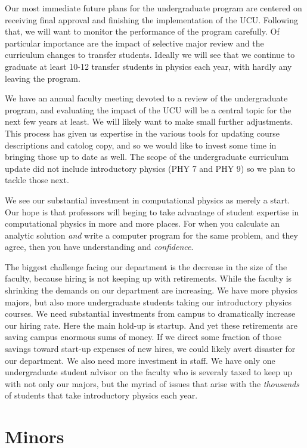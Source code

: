 \documentclass[12pt]{article}
\begin{document}
Our most immediate future plans for the undergraduate program are
centered on receiving final approval and finishing the implementation
of the UCU.  Following that, we will want to monitor the performance
of the program carefully.  Of particular importance are the impact of
selective major review and the curriculum changes to transfer
students.  Ideally we will see that we continue to graduate at least
10-12 transfer students in physics each year, with hardly any leaving
the program.

We have an annual faculty meeting devoted to a review of the
undergraduate program, and evaluating the impact of the UCU will be a
central topic for the next few years at least.  We will likely want to
make small further adjustments.  This process has given us expertise
in the various tools for updating course descriptions and catolog
copy, and so we would like to invest some time in bringing those up to
date as well.  The scope of the undergraduate curriculum update did
not include introductory physics (PHY 7 and PHY 9) so we plan to
tackle those next.

We see our substantial investment in computational physics as merely a
start.  Our hope is that professors will beging to take advantage of
student expertise in computational physics in more and more places.
For when you calculate an analytic solution {\em and} write a computer
program for the same problem, and they agree, then you have
understanding and {\em confidence}.

The biggest challenge facing our department is the decrease in the
size of the faculty, because hiring is not keeping up with
retirements.  While the faculty is shrinking the demands on our
department are increasing.  We have more physics majors, but also more
undergraduate students taking our introductory physics courses.  We
need substantial investments from campus to dramatically increase our
hiring rate.  Here the main hold-up is startup.  And yet these
retirements are saving campus enormous sums of money.  If we direct
some fraction of those savings toward start-up expenses of new hires,
we could likely avert disaster for our department.  We also need more
investment in staff.  We have only one undergraduate student advisor
on the faculty who is severaly taxed to keep up with not only our
majors, but the myriad of issues that arise with the {\em thousands}
of students that take introductory physics each year.

\newpage	
\section{Minors}
\end{document}
